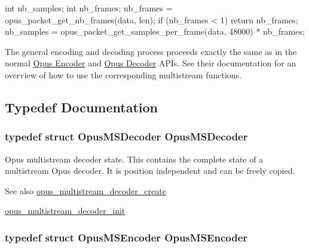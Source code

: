 \begin{DoxyCode}
 int nb_samples;
 int nb_frames;
 nb_frames = opus_packet_get_nb_frames(data, len);
 if (nb_frames < 1)
   return nb_frames;
 nb_samples = opus_packet_get_samples_per_frame(data, 48000) * nb_frames;
\end{DoxyCode}


The general encoding and decoding process proceeds exactly the same as in the normal \hyperlink{group__opus__encoder}{Opus Encoder} and \hyperlink{group__opus__decoder}{Opus Decoder} APIs. See their documentation for an overview of how to use the corresponding multistream functions. 

\subsection{Typedef Documentation}
\hypertarget{group__opus__multistream_gad3497495deb9a8ace82e76cd4f93e0e4}{
\subsubsection[{OpusMSDecoder}]{\setlength{\rightskip}{0pt plus 5cm}typedef struct {\bf OpusMSDecoder} {\bf OpusMSDecoder}}}
\label{group__opus__multistream_gad3497495deb9a8ace82e76cd4f93e0e4}


Opus multistream decoder state. This contains the complete state of a multistream Opus decoder. It is position independent and can be freely copied. \begin{DoxySeeAlso}{See also}
\hyperlink{group__opus__multistream_ga3c0e342774174c471e61cedba53755c9}{opus\_\-multistream\_\-decoder\_\-create} 

\hyperlink{group__opus__multistream_ga09a4d14fc497d4f6fbe76bd1c5d45436}{opus\_\-multistream\_\-decoder\_\-init} 
\end{DoxySeeAlso}
\hypertarget{group__opus__multistream_gae5826674d142fc873ebc1d781c507dd7}{
\subsubsection[{OpusMSEncoder}]{\setlength{\rightskip}{0pt plus 5cm}typedef struct {\bf OpusMSEncoder} {\bf OpusMSEncoder}}}
\label{group__opus__multistream_gae5826674d142fc873ebc1d781c507dd7}


